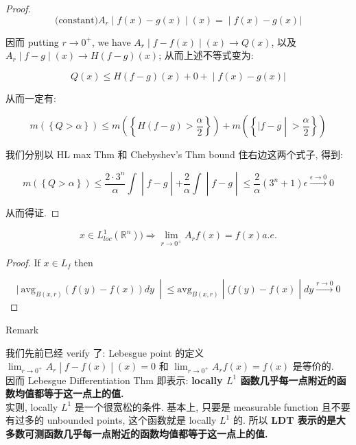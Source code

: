 \documentclass{qlnotes-export}
\begin{document}
\begin{proof}
\[\left. \text{(constant)} A_{r} \middle| f(x) - g(x) \middle| (x) = \middle| f(x) - g(x)| \right.\]

因而 putting \(r\rightarrow 0^{+}\), we have \(\left. A_{r} \middle| f - f(x) \middle| (x)\rightarrow Q(x) \right.\), 以及 \(\left. A_{r} \middle| f - g \middle| (x)\rightarrow H(f - g)(x) \right.\); 从而上述不等式变为:

\[\left. Q(x) \leq H(f - g)(x) + 0 + \middle| f(x) - g(x)| \right.\]

从而一定有:

\[m(\left\{ {Q > \alpha} \right\}) \leq m(\left\{ {H(f - g) > \frac{\alpha}{2}} \right\}) + m(\left\{ |f - g \middle| > \frac{\alpha}{2} \right\})\]

我们分别以 HL max Thm 和 Chebyshev's Thm bound 住右边这两个式子, 得到:

\[\left. m(\left\{ {Q > \alpha} \right\}) \leq \frac{2 \cdot 3^{n}}{\alpha}\int \middle| f - g \middle| + \frac{2}{\alpha}\int \middle| f - g \middle| \leq \frac{2}{\alpha}(3^{n} + 1)\epsilon\overset{\epsilon\rightarrow 0}{\rightarrow}0 \right.\]

从而得证.

\end{proof}

\begin{corollary}\label{cor-08-hardy-littlewood-ldt-corollary-002}

\[x \in L_{loc}^{1}({\mathbb{R}}^{n}))\Longrightarrow\lim\limits_{r\rightarrow 0^{+}}A_{r}f(x) = f(x) a.e.\]

\end{corollary}

\begin{proof}

If \(x \in L_{f}\) then

\[\left. |\ \text{avg}_{B(x,r)}(f(y) - f(x)) dy\  \middle| \leq \text{avg}_{B(x,r)} \middle| (f(y) - f(x) \middle| dy\overset{r\rightarrow 0}{\rightarrow}0 \right.\]

\end{proof}

\begin{qlremark}{Remark}

我们先前已经 verify 了: Lebesgue point 的定义 \(\left. \lim_{r\rightarrow 0^{+}}A_{r} \middle| f - f(x) \middle| (x) = 0 \right.\) 和 \(\lim_{r\rightarrow 0^{+}}A_{r}f(x) = f(x)\) 是等价的.\\
因而 Lebesgue Differentiation Thm 即表示: \textbf{locally \(L^{1}\) 函数几乎每一点附近的函数均值都等于这一点上的值.}\\
实则, locally \(L^{1}\) 是一个很宽松的条件. 基本上, 只要是 measurable function 且不要有过多的 unbounded points, 这个函数就是 locally \(L^{1}\) 的. 所以 \textbf{LDT 表示的是大多数可测函数几乎每一点附近的函数均值都等于这一点上的值.}\\

\end{qlremark}
\end{document}
